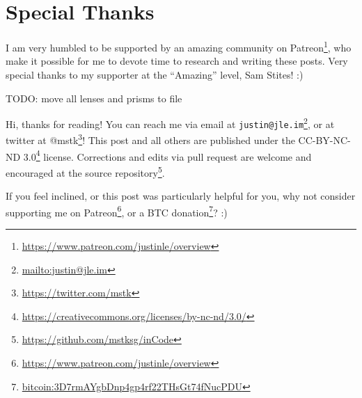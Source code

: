 \documentclass[]{article}
\renewcommand{\href}[2]{#2\footnote{\url{#1}}}
\begin{document}
\hypertarget{special-thanks}{%
\section{Special Thanks}\label{special-thanks}}

I am very humbled to be supported by an amazing community on
\href{https://www.patreon.com/justinle/overview}{Patreon}, who make it possible
for me to devote time to research and writing these posts. Very special thanks
to my supporter at the ``Amazing'' level, Sam Stites! :)

TODO: move all lenses and prisms to file

Hi, thanks for reading! You can reach me via email at
\href{mailto:justin@jle.im}{\nolinkurl{justin@jle.im}}, or at twitter at
\href{https://twitter.com/mstk}{@mstk}! This post and all others are published
under the \href{https://creativecommons.org/licenses/by-nc-nd/3.0/}{CC-BY-NC-ND
3.0} license. Corrections and edits via pull request are welcome and encouraged
at \href{https://github.com/mstksg/inCode}{the source repository}.

If you feel inclined, or this post was particularly helpful for you, why not
consider \href{https://www.patreon.com/justinle/overview}{supporting me on
Patreon}, or a \href{bitcoin:3D7rmAYgbDnp4gp4rf22THsGt74fNucPDU}{BTC donation}?
:)
\end{document}
